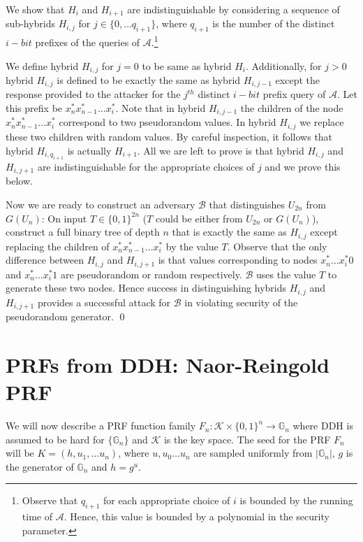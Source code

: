 \documentclass[12pt]{tufte-book}
\begin{document}
We show that $H_{i}$ and $H_{i+1}$ are indistinguishable by considering a sequence of sub-hybrids $H_{i,j}$ for $j \in \{0,\ldots q_{i+1}\}$, where $q_{i+1}$ is the number of the distinct $i-bit$ prefixes of the queries of $\mathcal{A}$.\footnote{Observe that $q_{i+1}$ for each appropriate choice of $i$ is bounded by the running time of $\mathcal{A}$. Hence, this value is bounded by a polynomial in the security parameter.}

We define hybrid $H_{i,j}$ for $j =0$ to be same as hybrid $H_{i}$. Additionally, for $j >0$ hybrid $H_{i,j}$ is defined to be exactly the same as hybrid $H_{i,j-1}$ except the response provided to the attacker for the $j^{th}$ distinct $i-bit$ prefix query of $\mathcal{A}$. Let this prefix be $x^*_n x^*_{n-1} \ldots x^*_{i}$. Note that in hybrid $H_{i,j-1}$ the children of the node $x^*_n x^*_{n-1} \ldots x^*_{i}$ correspond to two pseudorandom values. In hybrid $H_{i,j}$ we replace these two children with random values. By careful inspection, it follows that hybrid $H_{i,q_{i+1}}$ is actually $H_{i+1}$. All we are left to prove is that hybrid $H_{i,j}$ and $H_{i,j+1}$ are indistinguishable for the appropriate choices of $j$ and we prove this below.


Now we are ready to construct an adversary $\mathcal{B}$ that  distinguishes $U_{2n}$ from $G(U_n)$: On input $T \in\{0, 1\}^{2n}$ ($T$ could be either from $U_{2n}$ or $G(U_n)$),
construct a full binary tree of depth $n$ that is exactly the same as $H_{i,j}$ except replacing the children of  $x^*_n x^*_{n-1} \ldots x^*_{i}$ by the value $T$.
Observe that the only difference between $H_{i,j}$ and $H_{i,j+1}$ is that values corresponding to nodes $x_n^*\ldots x_i^* 0$ and $x_n^*\ldots x_i^* 1$ are pseudorandom or random respectively. $\mathcal{B}$ uses the value $T$ to generate these two nodes. Hence success in  distinguishing hybrids $H_{i,j}$ and $H_{i,j+1}$ provides a successful attack for $\mathcal{B}$ in violating security of the pseudorandom generator.
\qed







\section{PRFs from DDH: Naor-Reingold PRF}
We will now describe a PRF function family $F_n: \mathcal{K} \times \{0,1\}^n \rightarrow \mathbb{G}_n$ where DDH is assumed to be hard for  $\{\mathbb{G}_n\}$ and $\mathcal{K}$ is the key space.
The seed for the PRF $F_n$ will be $K =  (h, u_1, \ldots u_n)$, where $u,u_0\ldots u_n$ are sampled uniformly from $|\mathbb{G}_n|$, $g$ is the generator of $\mathbb{G}_n$ and $h = g^u$. 
\end{document}
